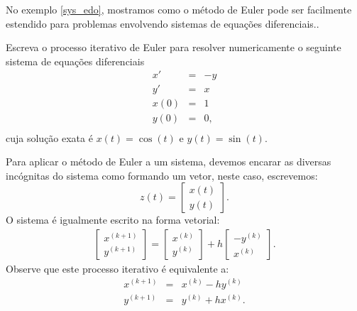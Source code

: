 No exemplo \ref{sys_edo}, mostramos como o método de Euler pode ser facilmente estendido para problemas envolvendo sistemas de equações diferenciais..
\begin{ex}\label{sys_edo} Escreva o processo iterativo de Euler para resolver numericamente o seguinte sistema de equações diferenciais
\begin{eqnarray*}
x'&=&-y\\
y'&=&x\\
x(0)&=&1\\
y(0)&=&0,\\
\end{eqnarray*}
cuja solução exata é $x(t)=\cos(t)$ e $y(t)=\sin(t)$.
\end{ex}
Para aplicar o método de Euler a um sistema, devemos encarar as diversas incógnitas do sistema como formando um vetor, neste caso, escrevemos:
 $$z(t)=\left[\begin{array}{c}x(t)\\y(t)\end{array}\right].$$
 O sistema é igualmente escrito na forma vetorial:
\begin{eqnarray*}
\left[\begin{array}{c}x^{(k+1)}\\y^{(k+1)}\end{array}\right]=\left[\begin{array}{c}x^{(k)}\\y^{(k)}\end{array}\right]+h\left[\begin{array}{c}-y^{(k)}\\x^{(k)}\end{array}\right].
\end{eqnarray*}
Observe que este processo iterativo é equivalente a:
\begin{eqnarray*}
x^{(k+1)}&=&x^{(k)}-hy^{(k)}\\
y^{(k+1)}&=&y^{(k)}+hx^{(k)}.
\end{eqnarray*}


